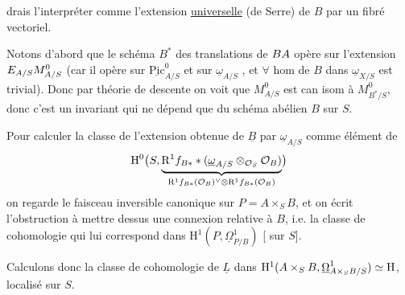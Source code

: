 drais l'interpréter comme l'extension \uline{universelle} (de Serre) de $B$ par un fibré vectoriel.

Notons d'abord que le schéma $B^*$ des translations de $BA$ opère  sur l'extension $E_{A/S}M^0_{A/S}$ (car il opère  sur $\underline{\mathrm{Pic}}^0_{A/S}$ et sur $\underline{\omega}_{A/S}$ \deleted{\unsure{\}}}, et $\forall$ hom de $B$ dans $\underline{\omega}_{X/S}$ est trivial). Donc par théorie de descente on voit que $M^0_{A/S}$ est can isom à $M^0_{B^*/S}$, donc c'est un invariant qui ne dépend que du  schéma abélien $B$ sur $S$.

Pour calculer la classe de l'extension obtenue de $\underline{B}$ par $\underline{\omega}_{A/S}$ comme élément de
\[
\mathrm{H}^0\bigl(S,\underbrace{\mathrm{R}^1f_{B*}*(\underline{\omega}_{A/S}\otimes_{\mathcal{O}_S}\mathcal{O}_B)}_{\mathrm{R}^1f_{B*}(\mathcal{O}_B)^\vee\otimes\mathrm{R}^1f_{B*}(\mathcal{O}_B)}\bigr)
\]
on regarde  le faisceau inversible canonique sur $P=A\times_S B$, et on écrit l'obstruction à mettre dessus une connexion relative à $B$, i.e. la classe de cohomologie qui lui correspond dans $\mathrm{H}^1(P,\underline{\Omega}^1_{P/B})$ [ sur $S$].

Calculons donc la classe de cohomologie de $\underline{L}$ dans $\mathrm{H}^1(A\times_S B,\underline{\Omega}^1_{A\times_S B/S})\simeq\mathrm{H}$, localisé sur $S$.
